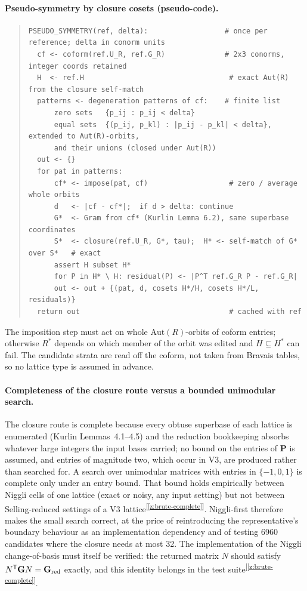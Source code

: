\documentclass[11pt]{article}
\newcommand{\Gmet}{\mathbf{G}}
\newcommand{\Pop}{\mathbf{P}}
\newcommand{\chk}[1]{\textsuperscript{[\ref{#1}]}}
\begin{document}
\paragraph{Pseudo-symmetry by closure cosets (pseudo-code).}
\begin{quote}\small\begin{verbatim}
PSEUDO_SYMMETRY(ref, delta):                  # once per reference; delta in conorm units
  cf <- coform(ref.U_R, ref.G_R)              # 2x3 conorms, integer coords retained
  H  <- ref.H                                  # exact Aut(R) from the closure self-match
  patterns <- degeneration patterns of cf:    # finite list
      zero sets   {p_ij : p_ij < delta}
      equal sets  {(p_ij, p_kl) : |p_ij - p_kl| < delta}, extended to Aut(R)-orbits,
      and their unions (closed under Aut(R))
  out <- {}
  for pat in patterns:
      cf* <- impose(pat, cf)                   # zero / average whole orbits
      d   <- |cf - cf*|;  if d > delta: continue
      G*  <- Gram from cf* (Kurlin Lemma 6.2), same superbase coordinates
      S*  <- closure(ref.U_R, G*, tau);  H* <- self-match of G* over S*   # exact
      assert H subset H*
      for P in H* \ H: residual(P) <- |P^T ref.G_R P - ref.G_R|
      out <- out + {(pat, d, cosets H*/H, cosets H*/L, residuals)}
  return out                                   # cached with ref
\end{verbatim}\end{quote}
The imposition step must act on whole $\mathrm{Aut}(R)$-orbits of coform entries; otherwise $R^*$ depends on which member of the orbit was edited and $H\subseteq H^*$ can fail. The candidate strata are read off the coform, not taken from Bravais tables, so no lattice type is assumed in advance.

\paragraph{Completeness of the closure route versus a bounded unimodular search.}
The closure route is complete because every obtuse superbase of each lattice is enumerated (Kurlin Lemmas~4.1--4.5) and the reduction bookkeeping absorbs whatever large integers the input bases carried; no bound on the entries of $\Pop$ is assumed, and entries of magnitude two, which occur in V3, are produced rather than searched for. A search over unimodular matrices with entries in $\{-1,0,1\}$ is complete only under an entry bound. That bound holds empirically between Niggli cells of one lattice (exact or noisy, any input setting) but not between Selling-reduced settings of a V3 lattice\chk{z:brute-complete}. Niggli-first therefore makes the small search correct, at the price of reintroducing the representative's boundary behaviour as an implementation dependency and of testing 6960 candidates where the closure needs at most 32. The implementation of the Niggli change-of-basis must itself be verified: the returned matrix $N$ should satisfy $N^{\mathsf T}\Gmet N=\Gmet_{\rm red}$ exactly, and this identity belongs in the test suite\chk{z:brute-complete}.
\end{document}
